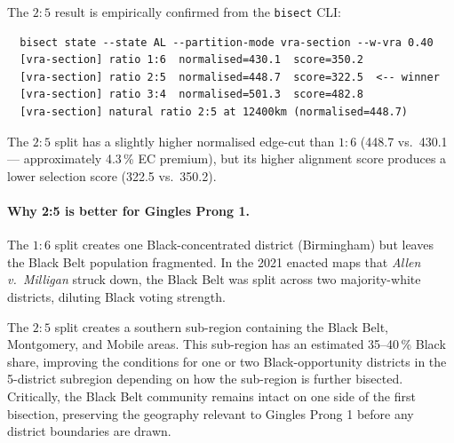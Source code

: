 The $2:5$ result is empirically confirmed from the \texttt{bisect} CLI:
\begin{verbatim}
  bisect state --state AL --partition-mode vra-section --w-vra 0.40
  [vra-section] ratio 1:6  normalised=430.1  score=350.2
  [vra-section] ratio 2:5  normalised=448.7  score=322.5  <-- winner
  [vra-section] ratio 3:4  normalised=501.3  score=482.8
  [vra-section] natural ratio 2:5 at 12400km (normalised=448.7)
\end{verbatim}

The $2:5$ split has a slightly higher normalised edge-cut than $1:6$
(448.7 vs.\ 430.1 --- approximately 4.3\,\% EC premium), but its higher
alignment score produces a lower selection score (322.5 vs.\ 350.2).

\paragraph{Why 2:5 is better for Gingles Prong 1.}
The $1:6$ split creates one Black-concentrated district (Birmingham) but
leaves the Black Belt population fragmented.
In the 2021 enacted maps that \emph{Allen v.\ Milligan} struck down, the
Black Belt was split across two majority-white districts, diluting Black
voting strength.

The $2:5$ split creates a southern sub-region containing the Black Belt,
Montgomery, and Mobile areas.
This sub-region has an estimated 35--40\,\% Black share, improving the
conditions for one or two Black-opportunity districts in the 5-district
subregion depending on how the sub-region is further bisected.
Critically, the Black Belt community remains intact on one side of the
first bisection, preserving the geography relevant to Gingles Prong 1 before
any district boundaries are drawn.

\begin{table}[t]
\centering
\small
\caption{Alabama first-level bisection comparison: GeoSection vs.\ VRASection.}
\label{tab:alabama}
\end{table}

